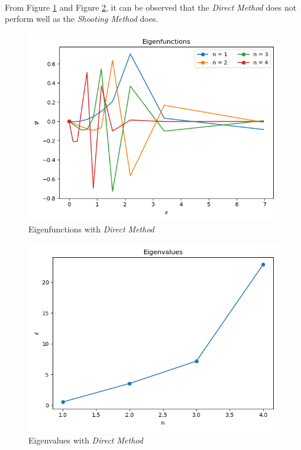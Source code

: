 \documentclass[letterpaper,12pt]{article}
\begin{document}
\paragraph{} From Figure \ref{fig:8_eigenfunctions} and Figure \ref{fig:8_eigenvalue}, it can be observed that the \textit{Direct Method} does not perform well as the \textit{Shooting Method} does. 
\begin{figure}[H]
\centerline{\includegraphics[width=\linewidth]{figures/8_eigenfunctions.png}}
\caption{Eigenfunctions with \textit{Direct Method}}
\label{fig:8_eigenfunctions}
\end{figure}

\begin{figure}[H]
\centerline{\includegraphics[width=\linewidth]{figures/8_eigenvalue.png}}
\caption{Eigenvalues with \textit{Direct Method}}
\label{fig:8_eigenvalue}
\end{figure}
    
\end{document}
